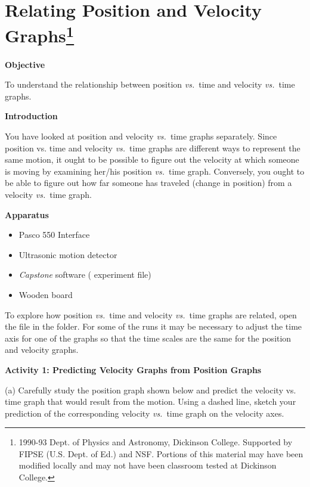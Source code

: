 
\section{Relating Position and Velocity Graphs\footnote{
1990-93 Dept. of Physics and Astronomy, Dickinson College. Supported by FIPSE
(U.S. Dept. of Ed.) and NSF. Portions of this material may have been modified
locally and may not have been classroom tested at Dickinson College.
}}

\makelabheader %

\medskip
\textbf{Objective }

To understand the relationship between position \textit{vs.}~time and velocity \textit{vs.}~time
graphs.

\medskip
\textbf{Introduction} 

You have looked at position and velocity \textit{vs.}~time graphs separately. Since position
vs. time and velocity \textit{vs.}~time graphs are different ways to represent the same
motion, it ought to be possible to figure out the velocity at which someone
is moving by examining her/his position \textit{vs.}~time graph. Conversely, you ought
to be able to figure out how far someone has traveled (change in position) from
a velocity \textit{vs.}~time graph.
\vspace{5mm}

\textbf{Apparatus} 

\begin{itemize}
\item Pasco 550 Interface
\item Ultrasonic motion detector 
\item \textit{Capstone} software ( experiment file)
\item Wooden board
\end{itemize}

To explore how position \textit{vs.}~time and velocity \textit{vs.}~time graphs are related, 
open the file  in the \filename{\coursefolder} folder.
For some of the runs it may be necessary to adjust the time axis for one of the graphs so that the time scales are the same for the position and velocity graphs.
\vspace{5mm}

\textbf{Activity 1: Predicting Velocity Graphs from Position Graphs} 

(a) Carefully study the position graph shown below and predict the velocity
vs. time graph that would result from the motion. Using a dashed line, sketch
your prediction of the corresponding velocity \textit{vs.}~time graph on the velocity
axes.

